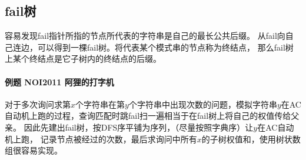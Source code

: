 \subsection{fail树}
容易发现fail指针所指的节点所代表的字符串是自己的最长公共后缀。
从fail向自己连边，可以得到一棵fail树。将代表某个模式串的节点称为终结点，
那么fail树上某个终结点是它子树内的终结点的后缀。

\paragraph{例题 NOI2011 阿狸的打字机}
对于多次询问求第$x$个字符串在第$y$个字符串中出现次数的问题，模拟字符串$y$在AC
自动机上跑的过程，查询匹配时跳fail扫一遍相当于在fail树上将自己的权值传给父亲。
因此先建出fail树，按DFS序平铺为序列，（尽量按照字典序）让$y$在AC自动机上跑，
记录节点被经过的次数，最后求询问中所有$x$的子树权值和，使用树状数组很容易实现。
